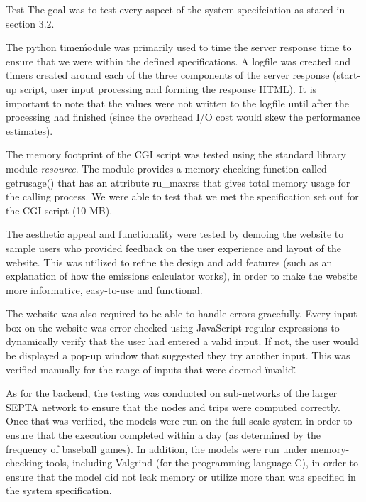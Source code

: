 Test
The goal was to test every aspect of the system specifciation as stated in section 3.2.

The python \'time\' module was primarily used to time the server response time to ensure that we were within the defined specifications.
A logfile was created and timers created around each of the three components of the server response (start-up script, user input processing and forming the response HTML). It is important to note that the values were not written to the logfile until after the processing had finished (since the overhead I/O cost would skew the performance estimates).

The memory footprint of the CGI script was tested using the standard library module \emph{resource}. The module provides a memory-checking function called getrusage() that has an attribute ru_maxrss that gives total memory usage for the calling process. We were able to test that we met the specification set out for the CGI script (10 MB).

The aesthetic appeal and functionality were tested by demoing the website to sample users who provided feedback on the user experience and layout of the website. This was utilized to refine the design and add features (such as an explanation of how the emissions calculator works), in order to make the website more informative, easy-to-use and functional.

The website was also required to be able to handle errors gracefully. Every input box on the website was error-checked using JavaScript regular expressions to dynamically verify that the user had entered a valid input. If not, the user would be displayed a pop-up window that suggested they try another input. This was verified manually for the range of inputs that were deemed \"invalid\".

As for the backend, the testing was conducted on sub-networks of the larger SEPTA network to ensure that the nodes and trips were computed correctly. Once that was verified, the models were run on the full-scale system in order to ensure that the execution completed within a day (as determined by the frequency of baseball games). In addition, the models were run under memory-checking tools, including Valgrind (for the programming language C), in order to ensure that the model did not leak memory or utilize more than was specified in the system specification.

